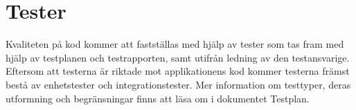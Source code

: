 \section{Tester}
Kvaliteten på kod kommer att fastställas med hjälp av tester som tas fram med hjälp av testplanen och testrapporten, samt utifrån ledning av den testansvarige. Eftersom att testerna är riktade mot applikationens kod kommer testerna främst bestå av enhetstester och integrationstester. Mer information om testtyper, deras utformning och begränsningar finns att läsa om i dokumentet Testplan.